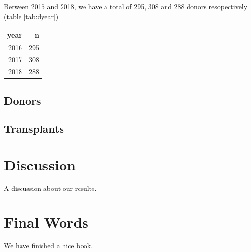 \documentclass[]{book}
\begin{document}
Between 2016 and 2018, we have a total of 295, 308 and 288 donors
resopectively (table \ref{tab:dyear})

\begin{tabular}{r|r}
\hline
year & n\\
\hline
2016 & 295\\
\hline
2017 & 308\\
\hline
2018 & 288\\
\hline
\end{tabular}

\section{Donors}\label{donors}

\section{Transplants}\label{transplants}

\chapter{Discussion}\label{discus}

A discussion about our results.

\chapter{Final Words}\label{final-words}

We have finished a nice book.


\end{document}
